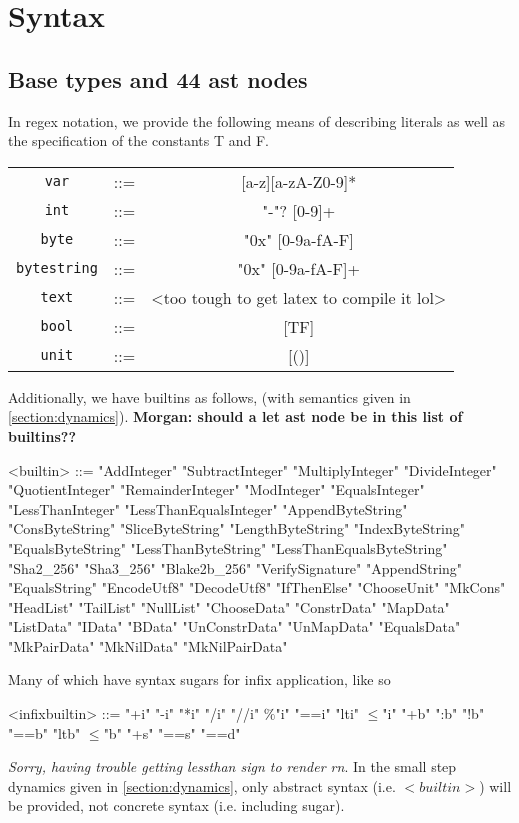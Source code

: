 \documentclass[../main.tex]{subfiles}
\begin{document}
\section{Syntax}\label{section:syntax}
\subsection{Base types and 44 ast nodes}
In regex notation, we provide the following means of describing literals as well as the specification of the constants T and F.
    \begin{center}
    \begin{tabular}{c c c}
        \texttt{var} & ::= & [a-z][a-zA-Z0-9]* \\
        \texttt{int} & ::= & "-"? [0-9]+ \\
        \texttt{byte} & ::= & "0x" [0-9a-fA-F] \\
        \texttt{bytestring} & ::= & "0x" [0-9a-fA-F]+ \\
        \texttt{text} & ::= & <too tough to get latex to compile it lol>  \\
        \texttt{bool} & ::= & [TF] \\
        \texttt{unit} & ::= & [()]
    \end{tabular}
    \end{center}
    \label{tab:atomsregex}

Additionally, we have builtins as follows, (with semantics given in \ref{section:dynamics}). \textbf{Morgan: should a let ast node be in this list of builtins??}
\begin{grammar}
    <builtin> ::=
        "AddInteger" \alt "SubtractInteger" \alt "MultiplyInteger"
        \alt "DivideInteger" \alt "QuotientInteger" \alt "RemainderInteger"
        \alt "ModInteger" \alt "EqualsInteger" \alt "LessThanInteger"
        \alt "LessThanEqualsInteger" \alt "AppendByteString"
        \alt "ConsByteString" \alt "SliceByteString" \alt "LengthByteString"
        \alt "IndexByteString" \alt "EqualsByteString" \alt "LessThanByteString"
        \alt "LessThanEqualsByteString" \alt "Sha2_256" \alt "Sha3_256" \alt "Blake2b_256"
        \alt "VerifySignature" \alt "AppendString" \alt "EqualsString"
        \alt "EncodeUtf8" \alt "DecodeUtf8" \alt "IfThenElse" \alt "ChooseUnit"
        \alt "MkCons" \alt "HeadList" \alt "TailList" \alt "NullList"
        \alt "ChooseData" \alt "ConstrData" \alt "MapData" \alt "ListData"
        \alt "IData" \alt "BData" \alt "UnConstrData" \alt "UnMapData"
        \alt "EqualsData" \alt "MkPairData" \alt "MkNilData" \alt "MkNilPairData"
\end{grammar}

Many of which have syntax sugars for infix application, like so
\begin{grammar}
    <infixbuiltin> ::=
        "+i" \alt "-i" \alt "*i" \alt "/i" \alt "//i" \alt $\%$"i" \alt "==i" \alt "lti" \alt $\leq$"i" \alt "+b" \alt ":b" \alt "!b" \alt "==b" \alt "ltb" \alt $\leq$"b" \alt "+s" \alt "==s" \alt "==d"
\end{grammar}
\textit{Sorry, having trouble getting lessthan sign to render rn}. In the small step dynamics given in \ref{section:dynamics}, only abstract syntax (i.e. $<builtin>$) will be provided, not concrete syntax (i.e. including sugar).
\end{document}
